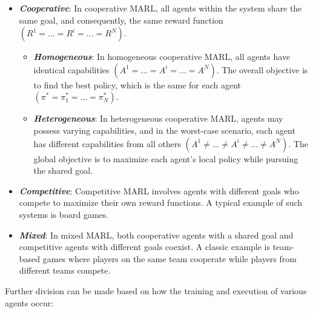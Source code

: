 \documentclass{scrartcl}
\begin{document}
\begin{itemize}
    \item \textbf{\textit{Cooperative}}: In cooperative MARL, all agents within the system share the same goal, and consequently, the same reward function $(R^1 = ... = R^i = ... = R^N)$.
    \begin{itemize}
        \item \textbf{\textit{Homogeneous}}: In homogeneous cooperative MARL, all agents have identical capabilities $(A^1 = ... = A^i = ... = A^N)$. The overall objective is to find the best policy, which is the same for each agent $(\pi^* = \pi^*_1 = ... = \pi^*_N)$.
        \item \textbf{\textit{Heterogeneous}}: In heterogeneous cooperative MARL, agents may possess varying capabilities, and in the worst-case scenario, each agent has different capabilities from all others $(A^1 \neq ... \neq A^i \neq ... \neq A^N)$. The global objective is to maximize each agent's local policy while pursuing the shared goal.
    \end{itemize}
    \item \textbf{\textit{Competitive}}: Competitive MARL involves agents with different goals who compete to maximize their own reward functions. A typical example of such systems is board games.
    \item \textbf{\textit{Mixed}}: In mixed MARL, both cooperative agents with a shared goal and competitive agents with different goals coexist. A classic example is team-based games where players on the same team cooperate while players from different teams compete.
\end{itemize}

Further division can be made based on how the training and execution of various agents occur:

%     
\end{document}
